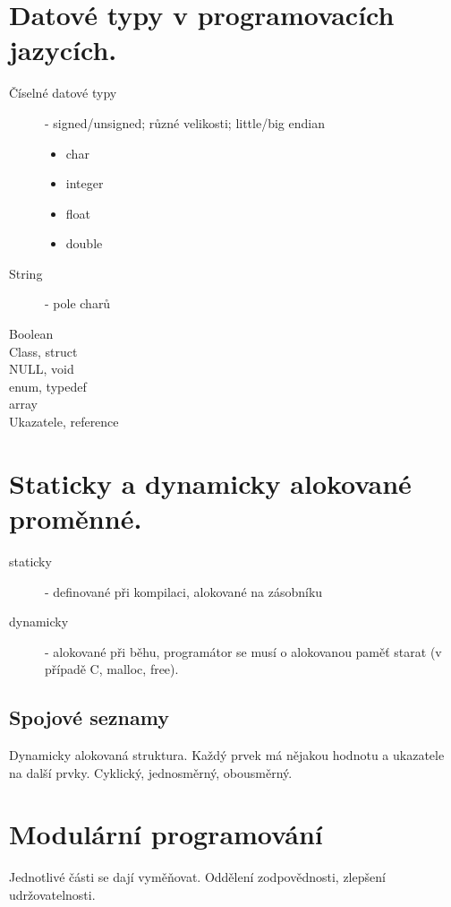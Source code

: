 \documentclass{szzclass}
\begin{document}
\tableofcontents
\newpage

\section{Datové typy v programovacích jazycích.}
\begin{description}
  \item[Číselné datové typy] - signed/unsigned; různé velikosti; little/big endian
  \begin{itemize}
    \item char
    \item integer
    \item float
    \item double
  \end{itemize}
  \item[String] - pole charů
  \item[Boolean]
  \item[Class, struct]
  \item[NULL, void]
  \item[enum, typedef]
  \item[array]
  \item[Ukazatele, reference]
\end{description}

\section{Staticky a dynamicky alokované proměnné.}
\begin{description}
  \item[staticky] - definované při kompilaci, alokované na zásobníku
  \item[dynamicky] - alokované při běhu, programátor se musí o alokovanou paměť starat (v případě C, malloc, free).
\end{description}

\subsection{Spojové seznamy}
Dynamicky alokovaná struktura. Každý prvek má nějakou hodnotu a ukazatele na další prvky. Cyklický, jednosměrný, obousměrný.

\section{Modulární programování}
Jednotlivé části se dají vyměňovat. Oddělení zodpovědnosti, zlepšení udržovatelnosti.
\end{document}

